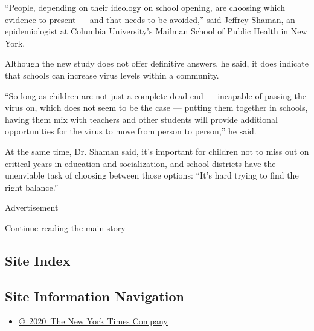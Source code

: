 ``People, depending on their ideology on school opening, are choosing
which evidence to present --- and that needs to be avoided,'' said
Jeffrey Shaman, an epidemiologist at Columbia University's Mailman
School of Public Health in New York.

Although the new study does not offer definitive answers, he said, it
does indicate that schools can increase virus levels within a community.

``So long as children are not just a complete dead end --- incapable of
passing the virus on, which does not seem to be the case --- putting
them together in schools, having them mix with teachers and other
students will provide additional opportunities for the virus to move
from person to person,'' he said.

At the same time, Dr. Shaman said, it's important for children not to
miss out on critical years in education and socialization, and school
districts have the unenviable task of choosing between those options:
``It's hard trying to find the right balance.''

Advertisement

\protect\hyperlink{after-bottom}{Continue reading the main story}

\hypertarget{site-index}{%
\subsection{Site Index}\label{site-index}}

\hypertarget{site-information-navigation}{%
\subsection{Site Information
Navigation}\label{site-information-navigation}}

\begin{itemize}
\tightlist
\item
  \href{https://help.nytimes3xbfgragh.onion/hc/en-us/articles/115014792127-Copyright-notice}{©~2020~The
  New York Times Company}
\end{itemize}

